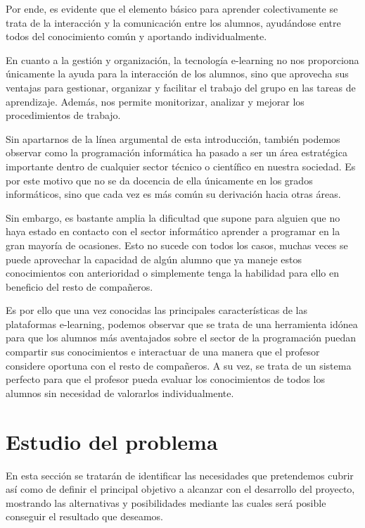 Por ende, es evidente que el elemento básico para aprender colectivamente se trata de la interacción y la comunicación entre los alumnos, ayudándose entre todos del conocimiento común y aportando individualmente.

En cuanto a la gestión y organización, la tecnología e-learning no nos proporciona únicamente la ayuda para la interacción de los alumnos, sino que aprovecha sus ventajas para gestionar, organizar y facilitar el trabajo del grupo en las tareas de aprendizaje. Además, nos permite monitorizar, analizar y mejorar los procedimientos de trabajo.

Sin apartarnos de la línea argumental de esta introducción, también podemos observar como la programación informática ha pasado a ser un área estratégica importante dentro de cualquier sector técnico o científico en nuestra sociedad. Es por este motivo que no se da docencia de ella únicamente en los grados informáticos, sino que cada vez es más común su derivación hacia otras áreas.

Sin embargo, es bastante amplia la dificultad que supone para alguien que no haya estado en contacto con el sector informático aprender a programar en la gran mayoría de ocasiones. Esto no sucede con todos los casos, muchas veces se puede aprovechar la capacidad de algún alumno que ya maneje estos conocimientos con anterioridad o simplemente tenga la habilidad para ello en beneficio del resto de compañeros.

Es por ello que una vez conocidas las principales características de las plataformas e-learning, podemos observar que se trata de una herramienta idónea para que los alumnos más aventajados sobre el sector de la programación puedan compartir sus conocimientos e interactuar de una manera que el profesor considere oportuna con el resto de compañeros. A su vez, se trata de un sistema perfecto para que el profesor pueda evaluar los conocimientos de todos los alumnos sin necesidad de valorarlos individualmente.

\newpage

\section{Estudio del problema}

En esta sección se tratarán de identificar las necesidades que pretendemos cubrir así como de definir el principal objetivo a alcanzar con el desarrollo del proyecto, mostrando las alternativas y posibilidades mediante las cuales será posible conseguir el resultado que deseamos.

